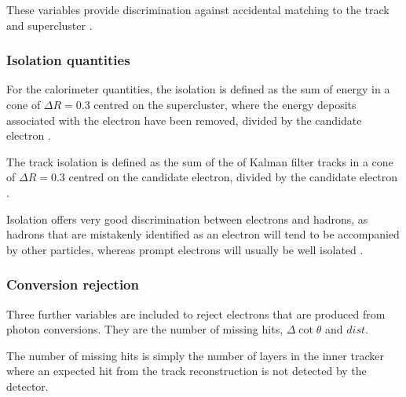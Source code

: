These variables provide discrimination against accidental matching to the track and
supercluster \cite{baffioni2009identification}. 


\subsubsection{Isolation quantities}
For the calorimeter quantities, the isolation is defined as the sum of energy in
a cone of $\Delta R = 0.3$ centred on the supercluster, where the energy
deposits associated with the electron have been removed, divided by the
candidate electron \Pt.

The track isolation is defined as the sum of the \Pt of Kalman filter tracks in
a cone of $\Delta R = 0.3 $ centred on the candidate electron, divided by the
candidate electron \Pt.

Isolation offers very good discrimination between electrons and hadrons, as
hadrons that are mistakenly identified as an electron will tend to be
accompanied by other particles, whereas prompt electrons will usually be well
isolated \cite{baffioni2009identification,nikos}.

\subsubsection{Conversion rejection}
Three further variables are included to reject electrons that are produced from
photon conversions. They are the number of missing hits, $\Delta\cot\theta$ and
$dist$. 

The number of missing hits is simply the number of layers in the inner
tracker where an expected hit from the track reconstruction is not detected by
the detector.

